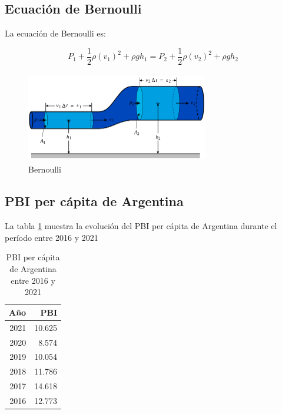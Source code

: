 \documentclass[runningheads]{llncs}
\begin{document}
\hypertarget{ecuaciuxf3n-de-bernoulli}{%
\subsection{Ecuación de Bernoulli}\label{ecuaciuxf3n-de-bernoulli}}

La ecuación de Bernoulli es:

\begin{equation}
P_1 + \frac{1}{2} \rho (v_1)^2 + \rho g h_1 = P_2 + \frac{1}{2} \rho (v_2)^2 + \rho g h_2 
\end{equation}

\begin{figure}
\centering
\includegraphics[width=3.125in,height=1.5625in]{BernoullisLawDerivationDiagram.svg.png}
\caption{Bernoulli}
\end{figure}

\hypertarget{pbi-per-cuxe1pita-de-argentina}{%
\subsection{PBI per cápita de
Argentina}\label{pbi-per-cuxe1pita-de-argentina}}

La tabla \ref{tab:table} muestra la evolución del PBI per cápita de
Argentina durante el período entre 2016 y 2021

\begin{table}

\caption{\label{tab:table}PBI per cápita de Argentina entre 2016 y 2021}
\centering
\begin{tabular}[t]{r|r}
\hline
Año & PBI\\
\hline
2021 & 10.625\\
\hline
2020 & 8.574\\
\hline
2019 & 10.054\\
\hline
2018 & 11.786\\
\hline
2017 & 14.618\\
\hline
2016 & 12.773\\
\hline
\end{tabular}
\end{table}

%
\end{document}
